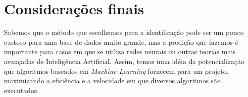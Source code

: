 \section{Considerações finais}
Sabemos que o método que escolhemos para a identificação pode ser um pouco custoso para uma base de dados muito grande, mas a predição que fazemos é importante para casos em que se utiliza redes neurais ou outras teorias mais avançadas de Inteligência Artificial. Assim, temos uma idéia da potencialização que algoritmos baseados em \emph{Machine Learning} fornecem para um projeto, maximizando a eficiência e a velocidade em que diversos algoritmos são executados.
